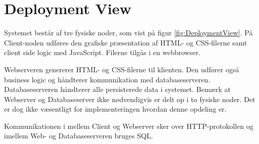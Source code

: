 \section{Deployment View}
Systemet består af tre fysiske noder, som vist på figur \ref{fig:DeploymentView}. På Client-noden udføres den grafiske præsentation af HTML- og CSS-filerne samt client side logic med JavaScript. Filerne tilgås i en webbrowser.

Webserveren genererer HTML- og CSS-filerne til klienten. Den udfører også business logic og håndterer kommunikation med databaseserveren.
Databaseserveren håndterer alle persisterede data i systemet.
Bemærk at Webserver og Databaseserver ikke nødvendigvis er delt op i to fysiske noder. Det er dog ikke væsentligt for implementeringen hvordan denne opdeling er.

Kommunikationen i mellem Client og Webserver sker over HTTP-protokollen og imellem Web- og Databaseserveren bruges SQL.

